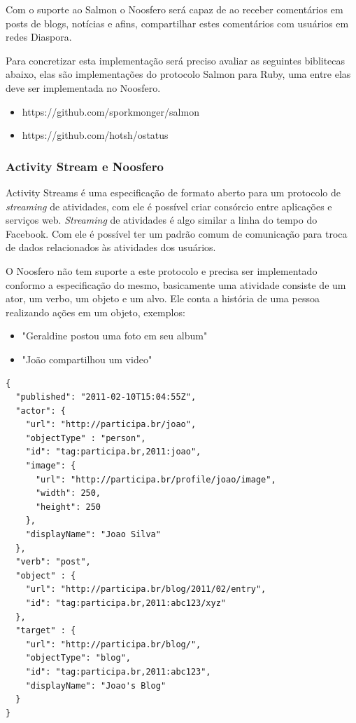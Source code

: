 \documentclass[12pt]{article}
\begin{document}
Com o suporte ao Salmon o Noosfero será capaz de ao receber comentários em
posts de blogs, notícias e afins, compartilhar estes comentários com usuários
em redes Diaspora.

Para concretizar esta implementação será preciso avaliar as seguintes
biblitecas abaixo, elas são implementações do protocolo Salmon para Ruby, uma
entre elas deve ser implementada no Noosfero.

\begin{itemize}
  \item https://github.com/sporkmonger/salmon
  \item https://github.com/hotsh/ostatus
\end{itemize}

\subsubsection{Activity Stream e Noosfero}

Activity Streams é uma especificação de formato aberto para um protocolo de
{\it streaming} de atividades, com ele é possível criar consórcio entre
aplicações e serviços web. {\it Streaming} de atividades é algo similar a
linha do tempo do Facebook. Com ele é possível ter um padrão comum de
comunicação para troca de dados relacionados às atividades dos usuários.

O Noosfero não tem suporte a este protocolo e precisa ser implementado
conformo a especificação do mesmo, basicamente uma atividade consiste de um
ator, um verbo, um objeto e um alvo. Ele conta a história de uma pessoa
realizando ações em um objeto, exemplos\cite{streams}:

\begin{itemize}
  \item "Geraldine postou uma foto em seu album"
  \item "João compartilhou um video"
\end{itemize}

\begin{framed}
\begin{lstlisting}[caption=Exemplo simples de atividade Activity Stream JSON serializada]
{
  "published": "2011-02-10T15:04:55Z",
  "actor": {
    "url": "http://participa.br/joao",
    "objectType" : "person",
    "id": "tag:participa.br,2011:joao",
    "image": {
      "url": "http://participa.br/profile/joao/image",
      "width": 250,
      "height": 250
    },
    "displayName": "Joao Silva"
  },
  "verb": "post",
  "object" : {
    "url": "http://participa.br/blog/2011/02/entry",
    "id": "tag:participa.br,2011:abc123/xyz"
  },
  "target" : {
    "url": "http://participa.br/blog/",
    "objectType": "blog",
    "id": "tag:participa.br,2011:abc123",
    "displayName": "Joao's Blog"
  }
}
\end{lstlisting}
\end{framed}
\end{document}
